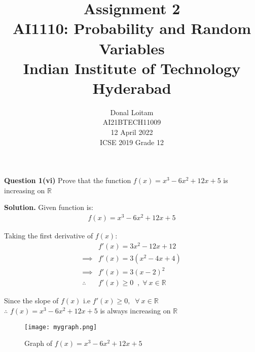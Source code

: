 \documentclass[journal,12pt,twocolumn]{IEEEtran}
\title{Assignment 2 \\ \Large AI1110: Probability and Random Variables \\ \large Indian Institute of Technology Hyderabad}
\author{Donal Loitam \\ \normalsize AI21BTECH11009 \\ \vspace*{20pt} \normalsize  12 April 2022 \\ \vspace*{20pt} \Large ICSE 2019 Grade 12}
\begin{document}
	\maketitle
	
	\textbf{Question 1(vi)} 
	Prove that the function $f(x)=x^3-6x^2+12x+5$ is increasing on $\mathbb{R}$
	
	\textbf{Solution.}
	Given function is:
	\begin{align}
		f(x)=x^3-6x^2+12x+5
	\end{align}
	
	Taking the first derivative of $f(x)$:
	\begin{align}
	 &f'(x)=3x^2-12x+12 \\
     \implies &f'(x)=3(x^2-4x+4) \\
     \implies &f'(x)=3(x-2)^2 \\
     \therefore\;\;\; & f'(x)\ge0 \;\;,\;\forall ~x \in \mathbb{R}
	\end{align}
	
  Since the slope of $f(x)$ i.e $f'(x)\ge0, \;\;\forall ~x \in \mathbb{R}$      \\ 
	$\therefore$\; $f(x)=x^3-6x^2+12x+5$ is always increasing on $\mathbb{R}$
	
	
	\begin{figure}[!ht]
		\centering
		\texttt{[image: mygraph.png]}
		\caption{Graph of $f(x) = x^3-6x^2+12x+5$ }
		\label{fig-1}
	\end{figure}
	
\end{document}

